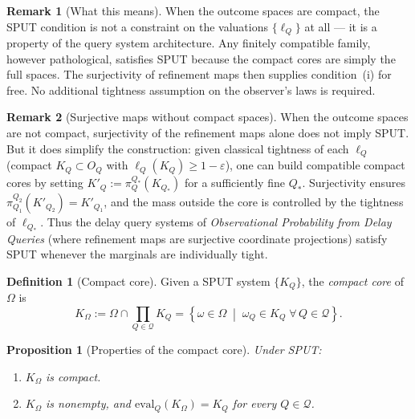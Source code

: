 \documentclass[11pt]{article}
\newtheorem{proposition}{Proposition}
\theoremstyle{definition}
\newtheorem{definition}{Definition}
\newtheorem{remark}{Remark}
\newcommand{\Qcal}{\mathcal{Q}}
\begin{document}
\begin{remark}[What this means]
When the outcome spaces are compact, the SPUT condition is not a
constraint on the valuations $\{\ell_Q\}$ at all — it is a property
of the query system architecture.  Any finitely compatible family,
however pathological, satisfies SPUT because the compact cores are
simply the full spaces.  The surjectivity of refinement maps then
supplies condition~(i) for free.  No additional tightness assumption
on the observer's laws is required.
\end{remark}

\begin{remark}[Surjective maps without compact spaces]
When the outcome spaces are not compact, surjectivity of the
refinement maps alone does not imply SPUT.  But it does simplify the
construction: given classical tightness of each $\ell_Q$ (compact
$K_Q \subset O_Q$ with $\ell_Q(K_Q) \geq 1 - \varepsilon$), one
can build compatible compact cores by setting $K'_Q :=
\pi^{Q_*}_Q(K_{Q_*})$ for a sufficiently fine $Q_*$.  Surjectivity
ensures $\pi^{Q_2}_{Q_1}(K'_{Q_2}) = K'_{Q_1}$, and the mass
outside the core is controlled by the tightness of $\ell_{Q_*}$.
Thus the delay query systems of \emph{Observational Probability from
Delay Queries} (where refinement maps are surjective coordinate
projections) satisfy SPUT whenever the marginals are individually
tight.
\end{remark}

\begin{definition}[Compact core]
Given a SPUT system $\{K_Q\}$, the \emph{compact core} of $\Omega$
is
\[
K_\Omega
:=
\Omega \cap \prod_{Q \in \Qcal} K_Q
=
\left\{
\omega \in \Omega
\;\middle|\;
\omega_Q \in K_Q \;\forall\, Q \in \Qcal
\right\}.
\]
\end{definition}

\begin{proposition}[Properties of the compact core]
\label{prop:compact-core}
Under SPUT:
\begin{enumerate}[label=(\roman*)]
\item $K_\Omega$ is compact.
\item $K_\Omega$ is nonempty, and $\mathrm{eval}_Q(K_\Omega) = K_Q$
  for every $Q \in \Qcal$.
\end{enumerate}
\end{proposition}
\end{document}
